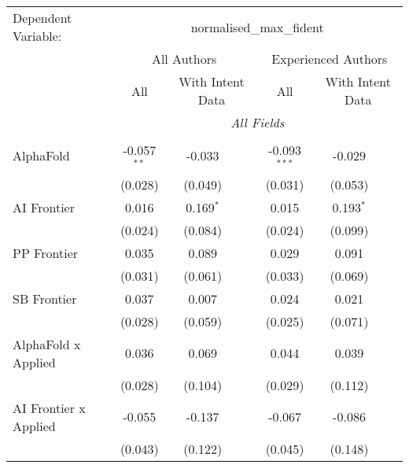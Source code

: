 \begingroup
\centering
\begin{tabular}{lcccccc}
   \tabularnewline \midrule \midrule
   Dependent Variable: & \multicolumn{6}{c}{normalised\_max\_fident}\\
 & \multicolumn{3}{c}{All Authors} & \multicolumn{3}{c}{Experienced Authors} \\
\cmidrule(lr){2-4} \cmidrule(lr){5-7}
 & \multicolumn{1}{c}{All} & \multicolumn{2}{c}{With Intent Data} & \multicolumn{1}{c}{All} & \multicolumn{2}{c}{With Intent Data} \\
\cmidrule(lr){2-2} \cmidrule(lr){3-4} \cmidrule(lr){5-5} \cmidrule(lr){6-7}
 & \multicolumn{6}{c}{\textit{All Fields}} \\ \\
   AlphaFold                      & -0.057$^{**}$ & -0.033      &                & -0.093$^{***}$ & -0.029      &   \\   
                                  & (0.028)       & (0.049)     &                & (0.031)        & (0.053)     &   \\   
   AI Frontier                    & 0.016         & 0.169$^{*}$ &                & 0.015          & 0.193$^{*}$ &   \\   
                                  & (0.024)       & (0.084)     &                & (0.024)        & (0.099)     &   \\   
   PP Frontier                    & 0.035         & 0.089       &                & 0.029          & 0.091       &   \\   
                                  & (0.031)       & (0.061)     &                & (0.033)        & (0.069)     &   \\   
   SB Frontier                    & 0.037         & 0.007       &                & 0.024          & 0.021       &   \\   
                                  & (0.028)       & (0.059)     &                & (0.025)        & (0.071)     &   \\   
   AlphaFold x Applied            & 0.036         & 0.069       &                & 0.044          & 0.039       &   \\   
                                  & (0.028)       & (0.104)     &                & (0.029)        & (0.112)     &   \\   
   AI Frontier x Applied          & -0.055        & -0.137      &                & -0.067         & -0.086      &   \\   
                                  & (0.043)       & (0.122)     &                & (0.045)        & (0.148)     &   \\   

\end{tabular}
